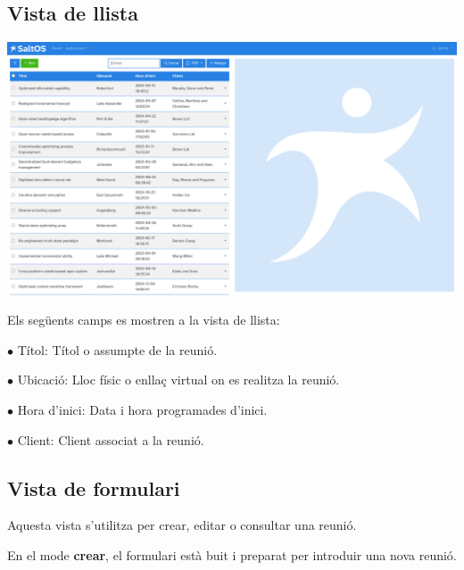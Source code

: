 \documentclass[a4paper]{article}
\begin{document}
\hypertarget{toc68}{}
\subsection{Vista de llista}

\begin{center}\includegraphics[width=1\textwidth]{../ujest/snaps/test-screenshots-js-screenshots-crm-meetings-list-ca-es-1-snap.png}\end{center}

Els següents camps es mostren a la vista de llista:

\begin{compactitem}
\item[\color{myblue}$\bullet$] Títol: Títol o assumpte de la reunió.
\item[\color{myblue}$\bullet$] Ubicació: Lloc físic o enllaç virtual on es realitza la reunió.
\item[\color{myblue}$\bullet$] Hora d'inici: Data i hora programades d'inici.
\item[\color{myblue}$\bullet$] Client: Client associat a la reunió.
\end{compactitem}

\hypertarget{toc69}{}
\subsection{Vista de formulari}

Aquesta vista s'utilitza per crear, editar o consultar una reunió.

En el mode \textbf{crear}, el formulari està buit i preparat per introduir una nova reunió.
\end{document}
